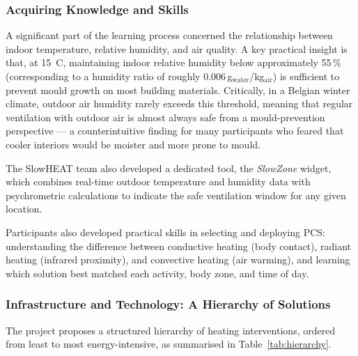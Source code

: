 \subsubsection{Acquiring Knowledge and Skills}

A significant part of the learning process concerned the
relationship between indoor temperature, relative humidity, and
air quality. A key practical insight is that, at 15\,\textdegree
C, maintaining indoor relative humidity below approximately
55\,\% (corresponding to a humidity ratio of roughly
0.006\,g$_\text{water}$/kg$_\text{air}$) is sufficient to
prevent mould growth on most building materials. Critically, in
a Belgian winter climate, outdoor air humidity rarely exceeds
this threshold, meaning that regular ventilation with outdoor
air is almost always safe from a mould-prevention perspective ---
a counterintuitive finding for many participants who feared that
cooler interiors would be moister and more prone to mould.

The SlowHEAT team also developed a dedicated tool, the
\textit{SlowZone} widget, which combines real-time outdoor
temperature and humidity data with psychrometric calculations
to indicate the safe ventilation window for any given location.

Participants also developed practical skills in selecting and
deploying PCS: understanding the difference between conductive
heating (body contact), radiant heating (infrared proximity),
and convective heating (air warming), and learning which
solution best matched each activity, body zone, and time of day.

\subsubsection{Infrastructure and Technology: A Hierarchy of Solutions}

The project proposes a structured hierarchy of heating
interventions, ordered from least to most energy-intensive, as
summarised in Table~\ref{tab:hierarchy}.


